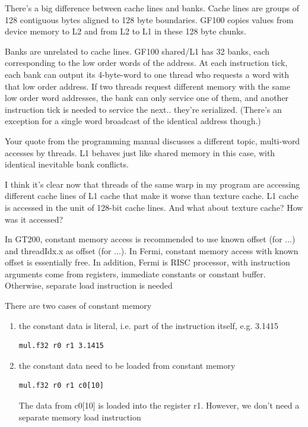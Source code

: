 There's a big difference between cache lines and banks. Cache lines
are groups of 128 contiguous bytes aligned to 128 byte
boundaries. GF100 copies values from device memory to L2 and from L2
to L1 in these 128 byte chunks.

Banks are unrelated to cache lines. GF100 shared/L1 has 32 banks, each
corresponding to the low order words of the address. At each
instruction tick, each bank can output its 4-byte-word to one thread
who requests a word with that low order address. If two threads
request different memory with the same low order word addresses, the
bank can only service one of them, and another instruction tick is
needed to service the next.. they're serialized. (There's an exception
for a single word broadcast of the identical address though.)

Your quote from the programming manual discusses a different topic,
multi-word accesses by threads. L1 behaves just like shared memory in
this case, with identical inevitable bank conflicts.

\begin{framed}
  I think it's clear now that threads of the same warp in my program
  are accessing different cache lines of L1 cache that make it worse
  than texture cache. L1 cache is accessed in the unit of 128-bit
  cache lines. And what about texture cache? How was it accessed?
\end{framed}

In GT200, constant memory access is recommended to use known offset
(for ...) and threadIdx.x as offset (for ...). In Fermi, constant
memory access with known offset is essentially free.  In addition,
Fermi is RISC processor, with instruction arguments come from
registers, immediate constants or constant buffer. Otherwise, separate
load instruction is needed

There are two cases of constant memory
\begin{enumerate}
\item the constant data is literal, i.e. part of the instruction
  itself, e.g. 3.1415
\begin{lstlisting}
mul.f32 r0 r1 3.1415
\end{lstlisting}

\item the constant data need to be loaded from constant memory
\begin{lstlisting}
mul.f32 r0 r1 c0[10]
\end{lstlisting}
  The data from c0[10] is loaded into the register r1. However, we
  don't need a separate memory load instruction

\end{enumerate}

